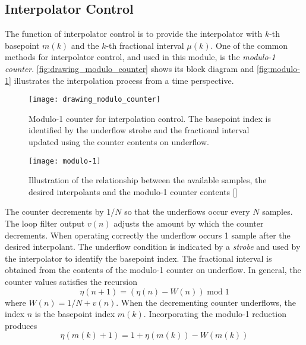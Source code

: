 \subsection{Interpolator Control}

The function of interpolator control is to provide the interpolator with $k$-th basepoint $m(k)$ and the $k$-th fractional interval $\mu(k)$. One of the common methods for interpolator control, and used in this module, is the \emph{modulo-1 counter}. \autoref{fig:drawing_modulo_counter} shows its block diagram and \autoref{fig:modulo-1} illustrates the interpolation process from a time perspective.

\begin{figure}[H]
  \centering
  \texttt{[image: drawing\_modulo\_counter]}
  \caption[Modulo-1 counter for interpolation control]{Modulo-1 counter for interpolation control. The basepoint index is identified by the underflow strobe and the fractional interval updated using the counter contents on underflow.}
  \label{fig:drawing_modulo_counter}
\end{figure}

\begin{figure}[H]
  \centering
  \texttt{[image: modulo-1]}
  \caption{Illustration of the relationship between the available samples, the desired interpolants and the modulo-1 counter contents [\citeauthor{digcomm_discrete_approach}]}
  \label{fig:modulo-1}
\end{figure}

The counter decrements by $1/N$ so that the underflows occur every $N$ samples. The loop filter output $v(n)$ adjusts the amount by which the counter decrements. When operating correctly the underflow occurs 1 sample after the desired interpolant. The underflow condition is indicated by a \emph{strobe} and used by the interpolator to identify the basepoint index. The fractional interval is obtained from the contents of the modulo-1 counter on underflow. In general, the counter values satisfies the recursion
\begin{equation}
\eta(n+1)=\left(\eta(n)-W(n)\right)\operatorname{mod}1
\end{equation}
where $W(n)=1/N+v(n)$. When the decrementing counter underflows, the index $n$ is the basepoint index $m(k)$. Incorporating the modulo-1 reduction produces
\begin{equation}
  \eta\left(m(k)+1\right)=1+\eta\left(m(k)\right)-W\left(m(k)\right)
\end{equation}

